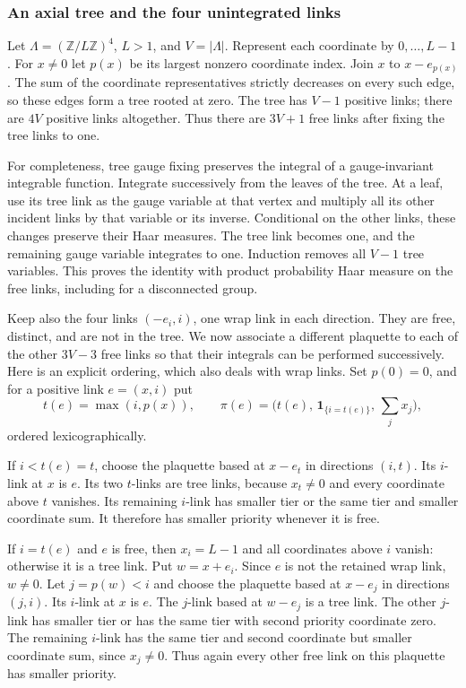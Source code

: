 \subsubsection{An axial tree and the four unintegrated links}

Let $\Lambda=(\mathbb Z/L\mathbb Z)^4$, $L>1$, and $V=|\Lambda|$.
Represent each coordinate by $0,\ldots,L-1$. For $x\ne0$ let $p(x)$
be its largest nonzero coordinate index. Join $x$ to $x-e_{p(x)}$.
The sum of the coordinate representatives strictly decreases on every
such edge, so these edges form a tree rooted at zero. The tree has
$V-1$ positive links; there are $4V$ positive links altogether. Thus
there are $3V+1$ free links after fixing the tree links to one.

For completeness, tree gauge fixing preserves the integral of a
gauge-invariant integrable function. Integrate successively from the
leaves of the tree. At a leaf, use its tree link as the gauge variable
at that vertex and multiply all its other incident links by that
variable or its inverse. Conditional on the other links, these changes
preserve their Haar measures. The tree link becomes one, and the
remaining gauge variable integrates to one. Induction removes all
$V-1$ tree variables. This proves the identity with product probability
Haar measure on the free links, including for a disconnected group.

Keep also the four links $(-e_i,i)$, one wrap link in each direction.
They are free, distinct, and are not in the tree. We now associate a
different plaquette to each of the other $3V-3$ free links so that their
integrals can be performed successively. Here is an explicit ordering,
which also deals with wrap links. Set $p(0)=0$, and for a positive
link $e=(x,i)$ put
\[
 t(e)=\max(i,p(x)),\qquad
 \pi(e)=\bigl(t(e),\,\mathbf1_{\{i=t(e)\}},\,
                   \textstyle\sum_jx_j\bigr),
\]
ordered lexicographically.

If $i<t(e)=t$, choose the plaquette based at $x-e_t$ in directions
$(i,t)$. Its $i$-link at $x$ is $e$. Its two $t$-links are tree links,
because $x_t\ne0$ and every coordinate above $t$ vanishes. Its remaining
$i$-link has smaller tier or the same tier and smaller coordinate sum.
It therefore has smaller priority whenever it is free.

If $i=t(e)$ and $e$ is free, then $x_i=L-1$ and all coordinates above
$i$ vanish: otherwise it is a tree link. Put $w=x+e_i$. Since $e$ is
not the retained wrap link, $w\ne0$. Let $j=p(w)<i$ and choose the
plaquette based at $x-e_j$ in directions $(j,i)$. Its $i$-link at $x$
is $e$. The $j$-link based at $w-e_j$ is a tree link. The other
$j$-link has smaller tier or has the same tier with second priority
coordinate zero. The remaining $i$-link has the same tier and second
coordinate but smaller coordinate sum, since $x_j\ne0$. Thus again
every other free link on this plaquette has smaller priority.

